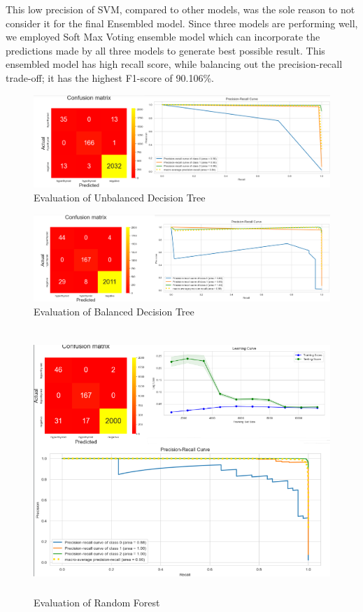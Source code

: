  This low precision of SVM, compared to other models, was the sole reason to not consider it for the final Ensembled model. Since three models are performing well, we employed Soft Max Voting ensemble model which can incorporate the predictions made by all three models to generate best possible result. This ensembled model has high recall score, while balancing out the precision-recall trade-off; it has the highest F1-score of 90.106\%.\\
\begin{figure}[h]
\centering
\includegraphics[scale=0.35]{unbalanced.png}
\caption{Evaluation of Unbalanced Decision Tree}
\end{figure}

\begin{figure}[h]
\centering
\includegraphics[scale=0.5, width=14cm]{balanced.png}
\caption{Evaluation of Balanced Decision Tree}
\end{figure}

\begin{figure}[h]
\centering
\includegraphics[scale=0.5,  height=10cm, width=14cm]{random.png}
\caption{Evaluation of Random Forest}
\end{figure}

